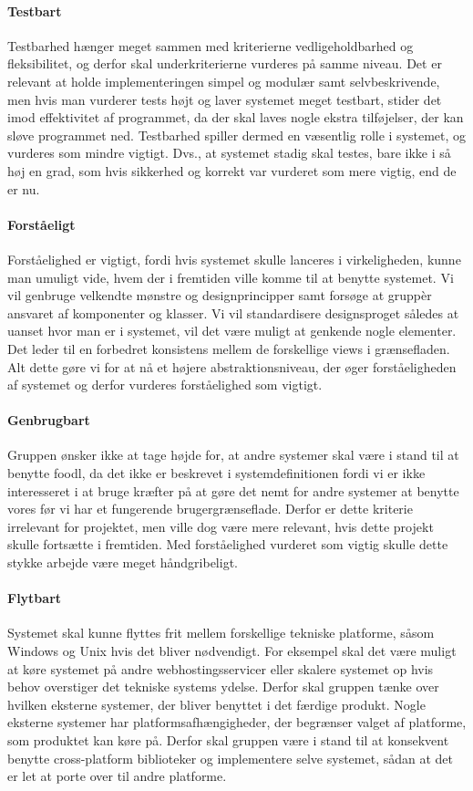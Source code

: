 \paragraph{Testbart} Testbarhed hænger meget sammen med kriterierne vedligeholdbarhed og fleksibilitet, og derfor skal underkriterierne vurderes på samme niveau. Det er relevant at holde implementeringen simpel og modulær samt selvbeskrivende, men hvis man vurderer tests højt og laver systemet meget testbart, stider det imod effektivitet af programmet, da der skal laves nogle ekstra tilføjelser, der kan sløve programmet ned. Testbarhed spiller dermed en væsentlig rolle i systemet, og vurderes som mindre vigtigt. Dvs., at systemet stadig skal testes, bare ikke i så høj en grad, som hvis sikkerhed og korrekt var vurderet som mere vigtig, end de er nu.

\paragraph{Forståeligt} Forståelighed er vigtigt, fordi hvis systemet skulle lanceres i virkeligheden, kunne man umuligt vide, hvem der i fremtiden ville komme til at benytte systemet. Vi vil genbruge velkendte mønstre og designprincipper samt forsøge at gruppèr ansvaret af komponenter og klasser. Vi vil standardisere designsproget således at uanset hvor man er i systemet, vil det være muligt at genkende nogle elementer. Det leder til en forbedret konsistens mellem de forskellige views i grænsefladen. Alt dette gøre vi for at nå et højere abstraktionsniveau, der øger forståeligheden af systemet og derfor vurderes forståelighed som vigtigt. 
 
\paragraph{Genbrugbart} Gruppen ønsker ikke at tage højde for, at andre systemer skal være i stand til at benytte foodl, da det ikke er beskrevet i systemdefinitionen fordi vi er ikke interesseret i at bruge kræfter på at gøre det nemt for andre systemer at benytte vores før vi har et fungerende brugergrænseflade. Derfor er dette kriterie irrelevant for projektet, men ville dog være mere relevant, hvis dette projekt skulle fortsætte i fremtiden. Med forståelighed vurderet som vigtig skulle dette stykke arbejde være meget håndgribeligt.

\paragraph{Flytbart} Systemet skal kunne flyttes frit mellem forskellige tekniske platforme, såsom Windows og Unix hvis det bliver nødvendigt. For eksempel skal det være muligt at køre systemet på andre webhostingsservicer eller skalere systemet op hvis behov overstiger det tekniske systems ydelse. Derfor skal gruppen tænke over hvilken eksterne systemer, der bliver benyttet i det færdige produkt. Nogle eksterne systemer har platformsafhængigheder, der begrænser valget af platforme, som produktet kan køre på. Derfor skal gruppen være i stand til at konsekvent benytte cross-platform biblioteker og implementere selve systemet, sådan at det er let at porte over til andre platforme.

